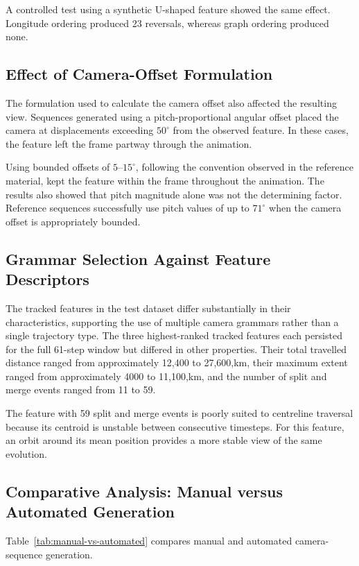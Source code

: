 \documentclass[journal abbreviation, manuscript]{copernicus}
\begin{document}
A controlled test using a synthetic U-shaped feature showed the same effect. Longitude ordering produced 23 reversals, whereas graph ordering produced none.

\subsection{Effect of Camera-Offset Formulation}

The formulation used to calculate the camera offset also affected the resulting view. Sequences generated using a pitch-proportional angular offset placed the camera at displacements exceeding $50^{\circ}$ from the observed feature. In these cases, the feature left the frame partway through the animation.

Using bounded offsets of $5$--$15^{\circ}$, following the convention observed in the reference material, kept the feature within the frame throughout the animation. The results also showed that pitch magnitude alone was not the determining factor. Reference sequences successfully use pitch values of up to $71^{\circ}$ when the camera offset is appropriately bounded.

\subsection{Grammar Selection Against Feature Descriptors}

The tracked features in the test dataset differ substantially in their characteristics, supporting the use of multiple camera grammars rather than a single trajectory type. The three highest-ranked tracked features each persisted for the full 61-step window but differed in other properties. Their total travelled distance ranged from approximately 12,400 to 27,600,km, their maximum extent ranged from approximately 4000 to 11,100,km, and the number of split and merge events ranged from 11 to 59.

The feature with 59 split and merge events is poorly suited to centreline traversal because its centroid is unstable between consecutive timesteps. For this feature, an orbit around its mean position provides a more stable view of the same evolution.

\subsection{Comparative Analysis: Manual versus Automated Generation}

Table~\ref{tab:manual-vs-automated} compares manual and automated camera-sequence generation.
\end{document}
